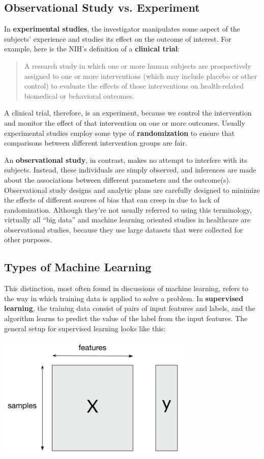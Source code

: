 \subsection{Observational Study vs. Experiment}

In \textbf{experimental studies}, the investigator manipulates some aspect of the subjects' experience and studies its effect on the outcome of interest. For example, here is the NIH's definition of a \textbf{clinical trial}:
\begin{quote}
A research study in which one or more human subjects are prospectively assigned to one or more interventions (which may include placebo or other control) to evaluate the effects of those interventions on health-related biomedical or behavioral outcomes.
\end{quote}
A clinical trial, therefore, is an experiment, because we control the intervention and monitor the effect of that intervention on one or more outcomes. Usually experimental studies employ some type of \textbf{randomization} to ensure that comparisons between different intervention groups are fair. 

An \textbf{observational study}, in contrast, makes no attempt to interfere with its subjects. Instead, these individuals are simply observed, and inferences are made about the associations between different parameters and the outcome(s). Observational study designs and analytic plans are carefully designed to minimize the effects of different sources of bias that can creep in due to lack of randomization. Although they're not usually referred to using this terminology, virtually all ``big data'' and machine learning oriented studies in healthcare are observational studies, because they use large datasets that were collected for other purposes.

\subsection{Types of Machine Learning}

This distinction, most often found in discussions of machine learning, refers to the way in which training data is applied to solve a problem. In \textbf{supervised learning}, the training data consist of pairs of input features and labels, and the algorithm learns to predict the value of the label from the input features. The general setup for supervised learning looks like this:
\begin{center}
\includegraphics[width=0.7\textwidth]{img/supervised-learning.png}
\end{center}

